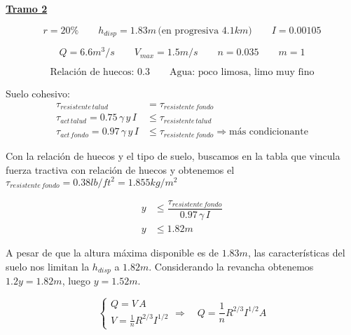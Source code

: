 \underline{\bf Tramo 2}


\begin{equation*}
  r = 20\%
 \qquad
  h_{disp} = 1.83 m \,\text{(en progresiva }4.1 km \text{)}
 \qquad
  I = 0.00105
\end{equation*}

\begin{equation*}
  Q = 6.6 m^3/s
 \qquad
  V_{max} = 1.5 m/s
 \qquad
  n = 0.035
 \qquad
  m = 1
\end{equation*}

\begin{equation*}
  \text{Relación de huecos: 0.3}
  \qquad
  \text{Agua: poco limosa, limo muy fino}
\end{equation*}

Suelo cohesivo:
\begin{align*}
 \tau_{resistente\,talud} &= \tau_{resistente\,fondo} \\
 \tau_{act\,talud} = 0.75 \, \gamma \, y \, I &\leq \tau_{resistente\,talud} \\
 \tau_{act\,fondo} = 0.97 \, \gamma \, y \, I &\leq \tau_{resistente\,fondo} \Longrightarrow \text{más condicionante}
\end{align*}

Con la relación de huecos y el tipo de suelo, buscamos en la tabla que vincula fuerza tractiva con relación de huecos y obtenemos
el $\tau_{resistente\,fondo} = 0.38 lb/ft^2 = 1.855 kg/m^2$

\begin{align*}
 y &\leq \dfrac{\tau_{resistente\,fondo}}{0.97 \, \gamma \, I} \\
 y &\leq 1.82 m
\end{align*}

A pesar de que la altura máxima disponible es de $1.83 m$, las características del suelo nos limitan la $h_{disp}$ a $1.82 m$.
Considerando la revancha obtenemos $1.2 y = 1.82 m$, luego $y = 1.52 m$.

\begin{equation*}
  \begin{cases}
    Q = V \, A \\
    V =  \frac{1}{n} R^{2/3} I^{1/2}
  \end{cases}
  \Longrightarrow \quad
  Q = \frac{1}{n} R^{2/3} I^{1/2} A
\end{equation*}


